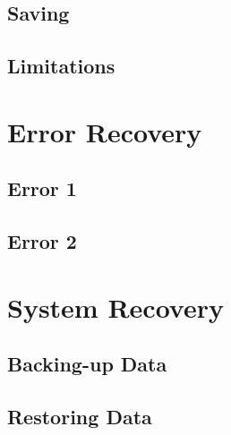 \subsection{Saving}

\subsection{Limitations}

\section{Error Recovery}

\subsection{Error 1}

\subsection{Error 2}

\section{System Recovery}

\subsection{Backing-up Data}

\subsection{Restoring Data}
